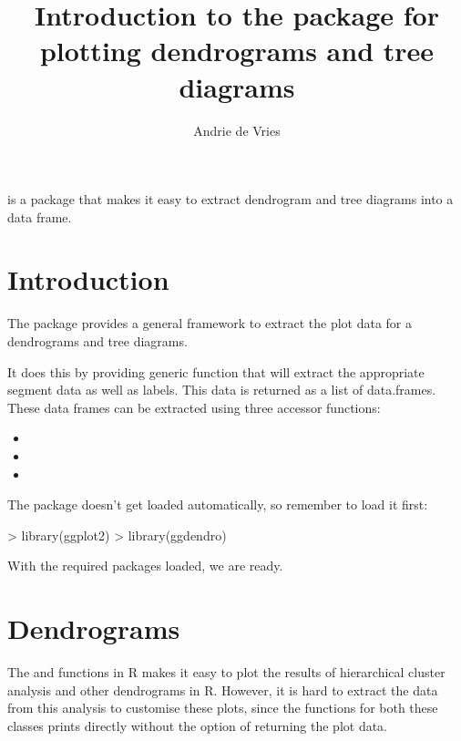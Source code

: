 \documentclass[10pt,oneside]{article}
\begin{document}
\pagestyle{empty}

\setlength{\baselineskip}{1.25em}
\setlength{\parskip}{0.5em}
\setlength{\parindent}{0.0em}

\title{Introduction to the \ggdendro{} package for plotting dendrograms and tree diagrams}
\author{Andrie de Vries}
\maketitle{}

\ggdendro{} is a package that makes it easy to extract dendrogram and tree diagrams into a data frame.  

\section{Introduction}

The \ggdendro{} package provides a general framework to extract the plot data for a dendrograms and tree diagrams.

It does this by providing generic function \dendrodata{} that will extract the appropriate segment data as well as labels.  This data is returned as a list of data.frames.  These data frames can be extracted using three accessor functions:

\begin{itemize}
\item {}
\item {}
\item {}
\end{itemize}

The  package doesn't get loaded automatically, so remember to load it first: 
  
\begin{Schunk}
\begin{Sinput}
> library(ggplot2)
> library(ggdendro)
\end{Sinput}
\end{Schunk}

With the required packages loaded, we are ready.


\section{Dendrograms}

The  and  functions in R makes it easy to plot the results of hierarchical cluster analysis and other dendrograms in R.  However, it is hard to extract the data from this analysis to customise these plots, since the  functions for both these classes prints directly without the option of returning the plot data.  
\end{document}
